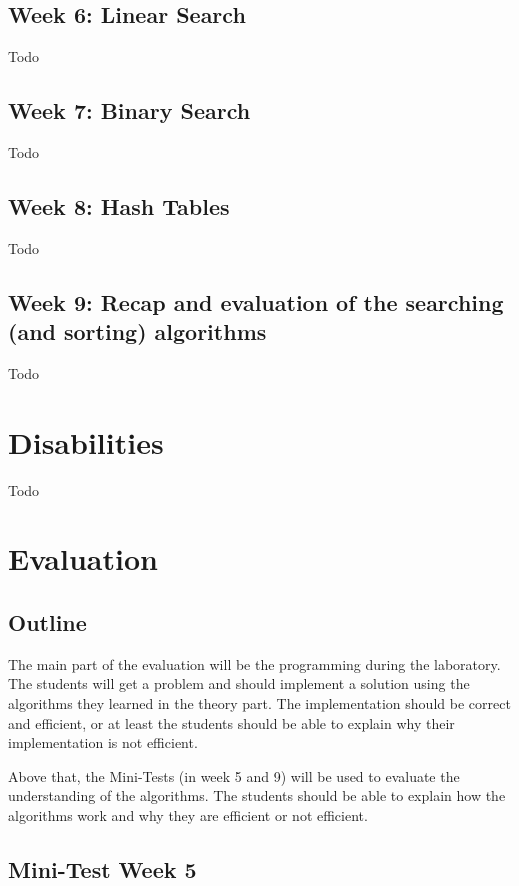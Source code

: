 \documentclass[10pt, oneside]{article}
\theoremstyle{remark}
\begin{document}
\subsection{Week 6: Linear Search}
Todo

\subsection{Week 7: Binary Search}
Todo

\subsection{Week 8: Hash Tables}
Todo

\subsection{Week 9: Recap and evaluation of the searching (and sorting) algorithms}
Todo

\section{Disabilities}
Todo

\section{Evaluation}
\subsection{Outline}
The main part of the evaluation will be the programming during the laboratory. The students will get a problem and should implement a solution using the algorithms they learned in the theory part. The implementation should be correct and efficient, or at least the students should be able to explain why their implementation is not efficient. 

Above that, the Mini-Tests (in week 5 and 9) will be used to evaluate the understanding of the algorithms. The students should be able to explain how the algorithms work and why they are efficient or not efficient. 

\subsection{Mini-Test Week 5}
\end{document}
